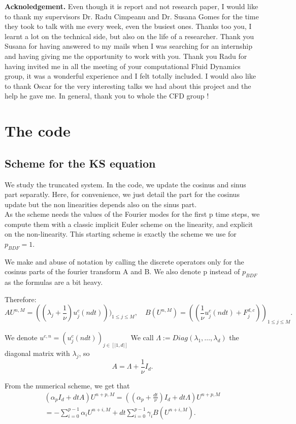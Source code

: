\documentclass[12pt]{article}
\begin{document}
\textbf{Acknoledgement.} Even though it is report and not research paper, I would like to thank my supervisors Dr. Radu
Cimpeanu and Dr. Susana Gomes for the time they took to talk with me every week, even the busiest ones. Thanks too you, I learnt a lot on the 
technical side, but also on the life of a researcher. Thank you Susana for having answered to my mails when I was searching 
for an internship and having giving me the opportunity to work with you. Thank you Radu for having invited me in all the 
meeting of your computational Fluid Dynamics group, it was a wonderful experience and I felt totally included. I would 
also like to thank Oscar for the very interesting talks we had about this project and the help he gave
me. In general, thank you to whole the CFD group ! 

\newpage
\appendix
\section{The code}
\subsection{Scheme for the KS equation}\label{KS_computation_numerics}

We study the truncated system. In the code, we update the cosinus and sinus part separatly. Here, for convenience, we just detail the part for the cosinus update but the non linearities depends also on the sinus part.
\\
As the scheme needs the values of the Fourier modes for the first p time steps, we compute them with a classic implicit Euler scheme on the linearity, and explicit on the non-linearity. This starting scheme is exactly the scheme we use for $p_{BDF}=1.$

We make and abuse of notation by calling the discrete operators only for the cosinus parts of the fourier transform A and B. We also denote p instead of $p_{BDF}$ as the formulas are a bit heavy.

Therefore: 
$$AU^{n, M} = ((\lambda_j + \frac{1}{\nu})u_j^c(ndt)))_{1\leq j \leq M}, \quad B(U^{n, M}) = ((\frac{1}{\nu}u_j^c(ndt) + F_j^{d,c}))_{1\leq j \leq M}.$$


We denote $u^{c,n} =(u_j^c(ndt))_{j\in [|1,d|]}$
We call $\Lambda:= Diag(\lambda_1,\dots,\lambda_d)$ the diagonal matrix with $\lambda_j$,  so $$A = \Lambda + \frac{1}{\nu}I_d.$$
  
From the numerical scheme, we get that 
\begin{align*}
  (\alpha_p I_d + dtA)U^{n+p, M} = ((\alpha_p+\frac{dt}{\nu}) I_d + dt\Lambda)U^{n+p, M}\\
  = -\sum_{i=0}^{p-1}\alpha_iU^{n+i, M} + dt\sum_{i=0}^{p-1}\gamma_i B(U^{n+i, M}).
\end{align*}
\end{document}
